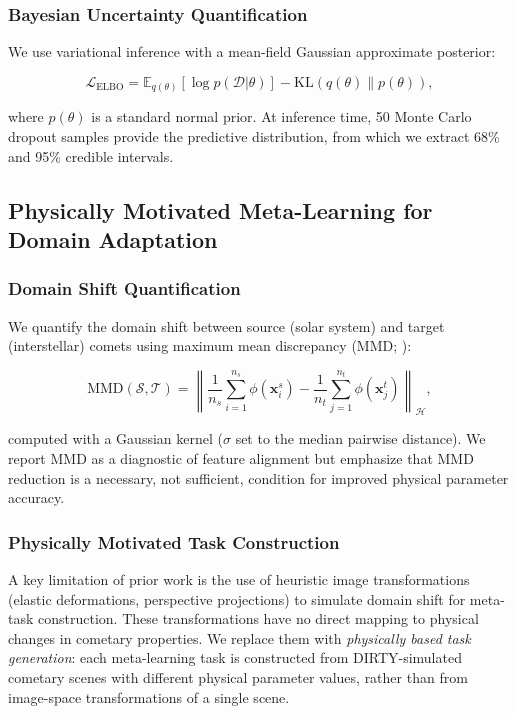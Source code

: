 \documentclass[preprint2]{aastex631}
\begin{document}
\subsubsection{Bayesian Uncertainty Quantification}

We use variational inference with a mean-field Gaussian approximate posterior:

\begin{equation}\label{eq:elbo}
\mathcal{L}_{\text{ELBO}} = \mathbb{E}_{q(\theta)}[\log p(\mathcal{D}|\theta)] - \text{KL}(q(\theta) \| p(\theta)),
\end{equation}

where $p(\theta)$ is a standard normal prior. At inference time, 50 Monte Carlo dropout samples \citep{gal16} provide the predictive distribution, from which we extract 68\% and 95\% credible intervals.

\subsection{Physically Motivated Meta-Learning for Domain Adaptation}\label{sec:domain_adapt}

\subsubsection{Domain Shift Quantification}

We quantify the domain shift between source (solar system) and target (interstellar) comets using maximum mean discrepancy (MMD; \citealt{gretton12}):

\begin{equation}\label{eq:mmd}
\text{MMD}(\mathcal{S}, \mathcal{T}) = \left\| \frac{1}{n_s}\sum_{i=1}^{n_s} \phi(\mathbf{x}_i^s) - \frac{1}{n_t}\sum_{j=1}^{n_t} \phi(\mathbf{x}_j^t) \right\|_{\mathcal{H}},
\end{equation}

computed with a Gaussian kernel ($\sigma$ set to the median pairwise distance). We report MMD as a diagnostic of feature alignment but emphasize that MMD reduction is a necessary, not sufficient, condition for improved physical parameter accuracy.

\subsubsection{Physically Motivated Task Construction}

A key limitation of prior work is the use of heuristic image transformations (elastic deformations, perspective projections) to simulate domain shift for meta-task construction. These transformations have no direct mapping to physical changes in cometary properties. We replace them with \textit{physically based task generation}: each meta-learning task is constructed from DIRTY-simulated cometary scenes with different physical parameter values, rather than from image-space transformations of a single scene.
\end{document}
